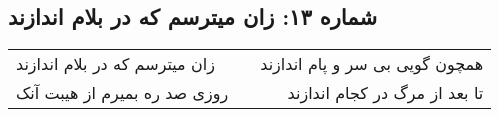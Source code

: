 \begin{center}
\section*{شماره ۱۳: زان میترسم که در بلام اندازند}
\label{sec:013}
\begin{longtable}{l p{0.5cm} r}
زان میترسم که در بلام اندازند
&&
همچون گویی بی سر و پام اندازند
\\
روزی صد ره بمیرم از هیبت آنک
&&
تا بعد از مرگ در کجام اندازند
\\
\end{longtable}
\end{center}
